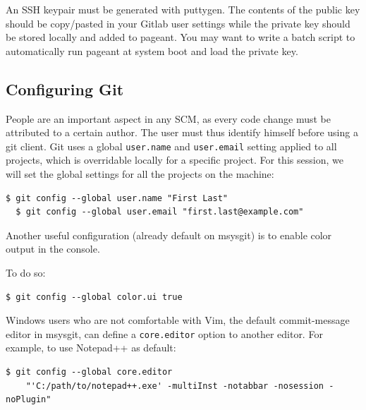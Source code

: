 \documentclass{../common/tufte-latex/tufte-handout}
\begin{document}
An SSH keypair must be generated with puttygen.
The contents of the public key should be copy/pasted in your Gitlab user settings while the private key should be stored locally and added to pageant. 
You may want to write a batch script to automatically run pageant at system boot and load the private key.

\subsection{Configuring Git}

People are an important aspect in any SCM, as every code change must be attributed to a certain author.
The user must thus identify himself before using a git client.
Git uses a global \texttt{user.name} and \texttt{user.email} setting applied to all projects, which is overridable locally for a specific project.
For this session, we will set the global settings for all the projects on the machine:

\begin{lstlisting}[style=BashInputStyle]
  $ git config --global user.name "First Last"
  $ git config --global user.email "first.last@example.com"
\end{lstlisting}

Another useful configuration (already default on msysgit) is to enable color output in the console.

\noindent To do so:

\begin{lstlisting}[style=BashInputStyle]
  $ git config --global color.ui true
\end{lstlisting}

Windows users who are not comfortable with Vim, the default commit-message editor in msysgit, can define a \texttt{core.editor} option to another editor.
For example, to use Notepad++ as default:

\begin{lstlisting}[style=BashInputStyle]
  $ git config --global core.editor
    "'C:/path/to/notepad++.exe' -multiInst -notabbar -nosession -noPlugin"
\end{lstlisting}
\end{document}
